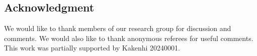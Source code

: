 \subsection*{Acknowledgment}
We would like to thank members of our research group for discussion and 
comments. We would also like to thank anonymous referees for useful 
comments. This work was partially supported by Kakenhi 20240001.
